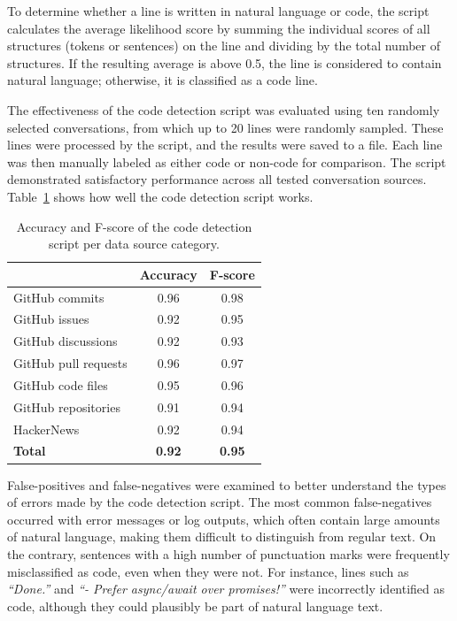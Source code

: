 To determine whether a line is written in natural language or code, the script calculates the average likelihood score by summing the individual scores of all structures (tokens or sentences) on the line and dividing by the total number of structures. If the resulting average is above 0.5, the line is considered to contain natural language; otherwise, it is classified as a code line.

The effectiveness of the code detection script was evaluated using ten randomly selected conversations, from which up to 20 lines were randomly sampled. These lines were processed by the script, and the results were saved to a file. Each line was then manually labeled as either code or non-code for comparison. The script demonstrated satisfactory performance across all tested conversation sources. Table~\ref{table:script-accuracy} shows how well the code detection script works.

\begin{table}[h]
    \centering
    \begin{tabular}{|l|c|c|}
        \hline
        & Accuracy & F-score  \\
        \hline
        GitHub commits & 0.96 & 0.98 \\
        \hline
        GitHub issues & 0.92 & 0.95 \\
        \hline
        GitHub discussions & 0.92 & 0.93 \\
        \hline
        GitHub pull requests & 0.96 & 0.97  \\
        \hline
        GitHub code files & 0.95 & 0.96  \\
        \hline
        GitHub repositories & 0.91 & 0.94  \\
        \hline
        HackerNews & 0.92 & 0.94  \\
        \hline
        \textbf{Total} & \textbf{0.92} & \textbf{0.95}  \\
        \hline
    \end{tabular}
    \caption{Accuracy and F-score of the code detection script per data source category.}
    \label{table:script-accuracy}
\end{table}

False-positives and false-negatives were examined to better understand the types of errors made by the code detection script. The most common false-negatives occurred with error messages or log outputs, which often contain large amounts of natural language, making them difficult to distinguish from regular text. On the contrary, sentences with a high number of punctuation marks were frequently misclassified as code, even when they were not. For instance, lines such as \textit{``Done.''} and \textit{``- Prefer async/await over promises!''} were incorrectly identified as code, although they could plausibly be part of natural language text.

